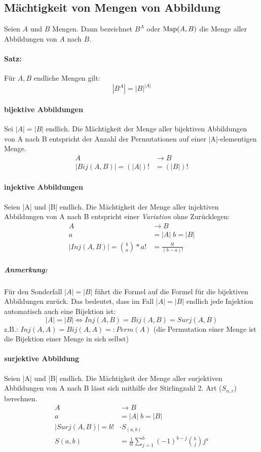 \subsection{Mächtigkeit von Mengen von Abbildung}
Seien $A$ und $B$ Mengen.
Dann bezeichnet $B^A$ oder $\text{Map}(A,B)$ die Menge aller Abbildungen von $A$
nach $B$. \paragraph*{Satz:}
Für $A, B$ endliche Mengen gilt:
$$ |B^A| = {|B|}^{|A|} $$

\paragraph*{bijektive Abbildungen}
Sei $|A|=|B|$ endlich. Die Mächtigkeit der Menge aller bijektiven
Abbildungen von A nach B entspricht der Anzahl der Permutationen auf
einer |A|-elementigen Menge.
\begin{align*}
  A &\rightarrow B \\
  |Bij(A,B)| = (|A|)! &= (|B|)!
\end{align*}

\paragraph*{injektive Abbildungen}
Seien |A| und |B| endlich. Die Mächtigkeit der Menge aller injektiven
Abbildungen von A nach B entspricht einer \emph{Variation} ohne Zurücklegen:
\begin{align*}
  A &\rightarrow B \\
  a &= |A| \; b = |B| \\
  |Inj(A,B)| =  
{{b}\choose{a}} * a!
  &= \frac{b!}{(b-a)!}
\end{align*}

\subparagraph*{Anmerkung:} Für den Sonderfall $|A|=|B|$ führt die Formel auf die Formel für die bijektiven Abbildungen zurück. Das bedeutet, dass im Fall $|A|=|B|$ endlich jede Injektion
automatisch auch eine Bijektion ist:
$$|A|=|B| \Longleftrightarrow Inj(A,B) = Bij(A,B) = Surj(A,B)$$
z.B.: $ Inj(A,A) = Bij(A,A) =: Perm(A) $
(die Permutation einer Menge ist die Bijektion einer Menge in sich selbst)

\paragraph*{surjektive Abbildung}
Seien |A| und |B| endlich. Die Mächtigkeit der Menge aller surjektiven
Abbildungen von A nach B lässt sich mithilfe der
Stirlingzahl 2. Art ($S_{n,r}$) berechnen.
\begin{align*}
  A &\rightarrow B \\
  a &= |A| \; b = |B| \\
  |Surj(A,B)| = 
  b!    &\cdot S_{(a,b)}\\
  S(a,b)&=\frac{1}{b!}\sum_{j=1}^{b}(-1)^{b-j}{b \choose j}j^a
\end{align*}

